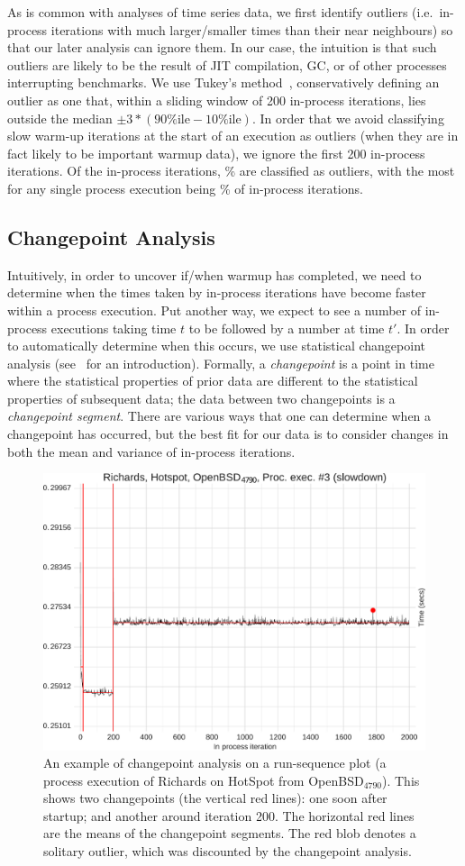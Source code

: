 \documentclass[preprint,numbers,10pt]{sigplanconf}
\newcommand{\benchersix}{OpenBSD$_\mathrm{4790}$\xspace}
\begin{document}
As is common with analyses of time series data, we first identify outliers
(i.e.~in-process iterations with much larger/smaller times than their near
neighbours) so that our later analysis can ignore them. In our case, the
intuition is that such outliers are likely to be the result of JIT compilation,
GC, or of other processes interrupting benchmarks. We use Tukey's
method~\cite{tukey1977exploratory}, conservatively defining an outlier as one that, within a
sliding window of 200 in-process iterations, lies outside the median $\pm
3*(90\%\textrm{ile} - 10\%\textrm{ile})$. In order that we avoid classifying
slow warm-up iterations at the start of an execution as outliers (when they are
in fact likely to be important warmup data), we ignore the first 200 in-process
iterations. Of the \totaliterations\xspace in-process
iterations, \totaloutlierspercentage\% are classified as outliers, with the most for
%
any single process execution being \result\% of in-process iterations.


\subsection{Changepoint Analysis}

Intuitively, in order to uncover if/when warmup has completed, we need to
determine when the times taken by in-process iterations have become faster
within a process execution. Put another way, we expect to see a number of in-process
executions taking time $t$ to be followed by a number at time $t'$. In order to
automatically determine when this occurs, we use statistical changepoint analysis
(see~\cite{eckley11analysis} for an introduction). Formally, a
\emph{changepoint} is a point in time where the statistical properties of prior
data are different to the statistical properties of subsequent data; the data
between two changepoints is a \emph{changepoint segment}. There are various
ways that one can determine when a changepoint has occurred, but the best fit
for our data is to consider changes in both the mean and variance of in-process
iterations.

\begin{figure}[t]
\centering
\includegraphics[width=.45\textwidth]{examples/changepoint_example.pdf}
\caption{An example of changepoint analysis on a run-sequence plot (a process
execution of Richards on HotSpot from \benchersix). This shows two changepoints
(the vertical red lines): one soon after startup; and another around iteration
200. The horizontal red lines are the means of the changepoint segments. The red
blob denotes a solitary outlier, which was discounted by the changepoint analysis.}
\label{fig:changepoint}
\end{figure}
\end{document}
